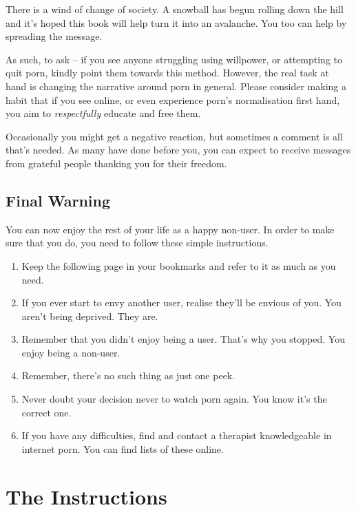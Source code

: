 \documentclass[
]{book}
\begin{document}
There is a wind of change of society. A snowball has begun rolling down the hill and it's hoped this book will help turn it into an avalanche. You too can help by spreading the message.

As such, to ask -- if you see anyone struggling using willpower, or attempting to quit porn, kindly point them towards this method. However, the real task at hand is changing the narrative around porn in general. Please consider making a habit that if you see online, or even experience porn's normalisation first hand, you aim to \emph{respectfully} educate and free them.

Occasionally you might get a negative reaction, but sometimes a comment is all that's needed. As many have done before you, you can expect to receive messages from grateful people thanking you for their freedom.

\hypertarget{final-warning}{%
\section{Final Warning}\label{final-warning}}

You can now enjoy the rest of your life as a happy non-user. In order to make sure that you do, you need to follow these simple instructions.

\begin{enumerate}
\def\labelenumi{\arabic{enumi}.}
\item
  Keep the following page in your bookmarks and refer to it as much as you need.
\item
  If you ever start to envy another user, realise they'll be envious of you. You aren't being deprived. They are.
\item
  Remember that you didn't enjoy being a user. That's why you stopped. You enjoy being a non-user.
\item
  Remember, there's no such thing as just one peek.
\item
  Never doubt your decision never to watch porn again. You know it's the correct one.
\item
  If you have any difficulties, find and contact a therapist knowledgeable in internet porn. You can find lists of these online.
\end{enumerate}

\hypertarget{the-instructions}{%
\chapter{The Instructions}\label{the-instructions}}
\end{document}
